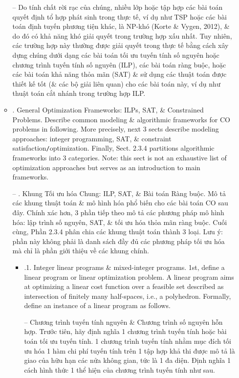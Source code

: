 \documentclass{article}
\begin{document}
\begin{itemize}
\begin{itemize}
        -- Do tính chất rời rạc của chúng, nhiều lớp hoặc tập hợp các bài toán quyết định tổ hợp phát sinh trong thực tế, ví dụ như TSP hoặc các bài toán định tuyến phương tiện khác, là NP-khó (Korte \& Vygen, 2012), \& do đó có khả năng khó giải quyết trong trường hợp xấu nhất. Tuy nhiên, các trường hợp này thường được giải quyết trong thực tế bằng cách xây dựng chúng dưới dạng các bài toán tối ưu tuyến tính số nguyên hoặc chương trình tuyến tính số nguyên (ILP), các bài toán ràng buộc, hoặc các bài toán khả năng thỏa mãn (SAT) \& sử dụng các thuật toán được thiết kế tốt (\& các bộ giải liên quan) cho các bài toán này, ví dụ như thuật toán cắt nhánh trong trường hợp ILP.
        \item {. General Optimization Frameworks: ILPs, SAT, \& Constrained Problems.} Describe common modeling \& algorithmic frameworks for CO problems in following. More precisely, next 3 sects describe modeling approaches: integer programming, SAT, \& constraint satisfaction{\tt/}optimization. Finally, Sect. 2.3.4 partitions algorithmic frameworks into 3 categories. Note: this sect is not an exhaustive list of optimization approaches but serves as an introduction to main frameworks.

        -- {\sf. Khung Tối ưu hóa Chung: ILP, SAT, \& Bài toán Ràng buộc.} Mô tả các khung thuật toán \& mô hình hóa phổ biến cho các bài toán CO sau đây. Chính xác hơn, 3 phần tiếp theo mô tả các phương pháp mô hình hóa: lập trình số nguyên, SAT, \& tối ưu hóa thỏa mãn ràng buộc. Cuối cùng, Phần 2.3.4 phân chia các khung thuật toán thành 3 loại. Lưu ý: phần này không phải là danh sách đầy đủ các phương pháp tối ưu hóa mà chỉ là phần giới thiệu về các khung chính.
        \begin{itemize}
            \item {.1. Integer linear programs \& mixed-integer programs.} 1st, define a linear program or linear optimization problem. A linear program aims at optimizing a linear cost function over a feasible set described as intersection of finitely many half-spaces, i.e., a polyhedron. Formally, define an instance of a linear program as follows.

            -- {\sf Chương trình tuyến tính nguyên \& Chương trình số nguyên hỗn hợp.} Trước tiên, hãy định nghĩa 1 chương trình tuyến tính hoặc bài toán tối ưu tuyến tính. 1 chương trình tuyến tính nhằm mục đích tối ưu hóa 1 hàm chi phí tuyến tính trên 1 tập hợp khả thi được mô tả là giao của hữu hạn các nửa không gian, tức là 1 đa diện. Định nghĩa 1 cách hình thức 1 thể hiện của chương trình tuyến tính như sau.


\end{itemize}
\end{itemize}
\end{itemize}
\end{document}
